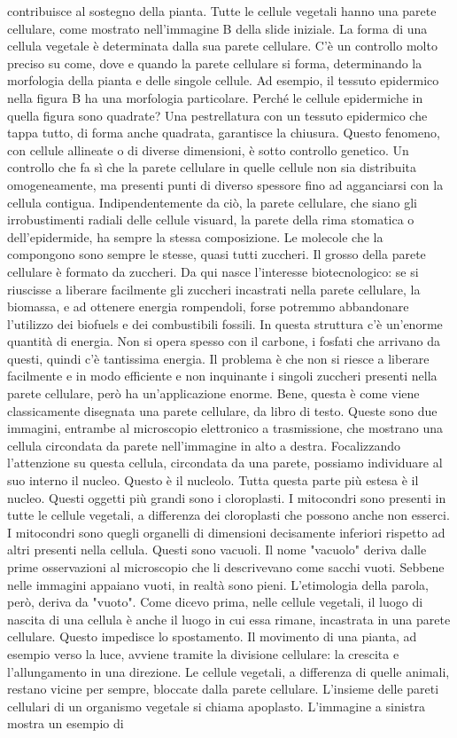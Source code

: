 \documentclass[11pt, a4paper]{article}
\begin{document}
\begin{spacing}{1.15}
contribuisce al sostegno della pianta. Tutte le cellule vegetali hanno una parete cellulare, come mostrato nell'immagine B della slide iniziale. La forma di una cellula vegetale è determinata dalla sua parete cellulare. C'è un controllo molto preciso su come, dove e quando la parete cellulare si forma, determinando la morfologia della pianta e delle singole cellule. Ad esempio, il tessuto epidermico nella figura B ha una morfologia particolare. Perché le cellule epidermiche in quella figura sono quadrate? Una pestrellatura con un tessuto epidermico che tappa tutto, di forma anche quadrata, garantisce la chiusura. Questo fenomeno, con cellule allineate o di diverse dimensioni, è sotto controllo genetico. Un controllo che fa sì che la parete cellulare in quelle cellule non sia distribuita omogeneamente, ma presenti punti di diverso spessore fino ad agganciarsi con la cellula contigua. Indipendentemente da ciò, la parete cellulare, che siano gli irrobustimenti radiali delle cellule visuard, la parete della rima stomatica o dell'epidermide, ha sempre la stessa composizione. Le molecole che la compongono sono sempre le stesse, quasi tutti zuccheri. Il grosso della parete cellulare è formato da zuccheri. Da qui nasce l'interesse biotecnologico: se si riuscisse a liberare facilmente gli zuccheri incastrati nella parete cellulare, la biomassa, e ad ottenere energia rompendoli, forse potremmo abbandonare l'utilizzo dei biofuels e dei combustibili fossili. In questa struttura c'è un'enorme quantità di energia. Non si opera spesso con il carbone, i fosfati che arrivano da questi, quindi c'è tantissima energia. Il problema è che non si riesce a liberare facilmente e in modo efficiente e non inquinante i singoli zuccheri presenti nella parete cellulare, però ha un'applicazione enorme. Bene, questa è come viene classicamente disegnata una parete cellulare, da libro di testo. Queste sono due immagini, entrambe al microscopio elettronico a trasmissione, che mostrano una cellula circondata da parete nell'immagine in alto a destra. Focalizzando l'attenzione su questa cellula, circondata da una parete, possiamo individuare al suo interno il nucleo. Questo è il nucleolo. Tutta questa parte più estesa è il nucleo. Questi oggetti più grandi sono i cloroplasti. I mitocondri sono presenti in tutte le cellule vegetali, a differenza dei cloroplasti che possono anche non esserci. I mitocondri sono quegli organelli di dimensioni decisamente inferiori rispetto ad altri presenti nella cellula. Questi sono vacuoli. Il nome "vacuolo" deriva dalle prime osservazioni al microscopio che li descrivevano come sacchi vuoti. Sebbene nelle immagini appaiano vuoti, in realtà sono pieni. L'etimologia della parola, però, deriva da "vuoto".  Come dicevo prima, nelle cellule vegetali, il luogo di nascita di una cellula è anche il luogo in cui essa rimane, incastrata in una parete cellulare. Questo impedisce lo spostamento. Il movimento di una pianta, ad esempio verso la luce, avviene tramite la divisione cellulare: la crescita e l'allungamento in una direzione. Le cellule vegetali, a differenza di quelle animali, restano vicine per sempre, bloccate dalla parete cellulare. L'insieme delle pareti cellulari di un organismo vegetale si chiama apoplasto. L'immagine a sinistra mostra un esempio di 
\end{spacing}
\end{document}
